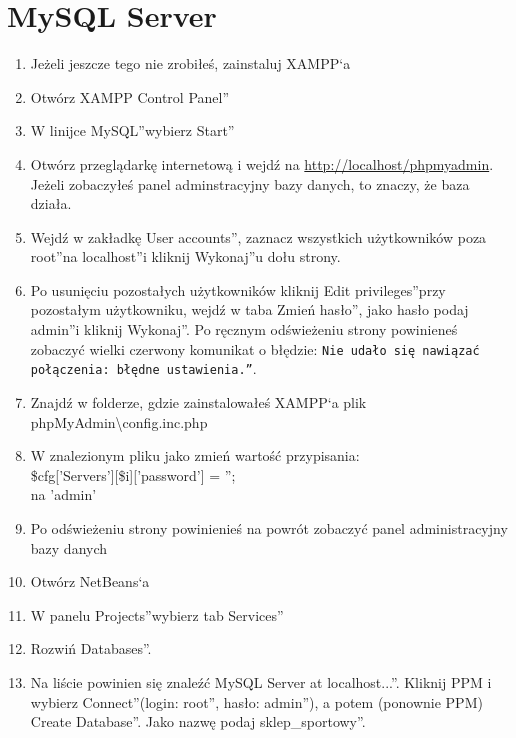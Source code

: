 \documentclass[a4paper, 11pt]{article}
\begin{document}
	\section{MySQL Server}
	\begin{enumerate}
		\item Jeżeli jeszcze tego nie zrobiłeś, zainstaluj XAMPP`a
		\item Otwórz \quotedblbase XAMPP Control Panel\textquotedblright
		\item W linijce \quotedblbase MySQL\textquotedblright wybierz \quotedblbase Start\textquotedblright
		\item Otwórz przeglądarkę internetową i wejdź na \url{http://localhost/phpmyadmin}. Jeżeli zobaczyłeś panel adminstracyjny bazy danych, to znaczy, że baza działa.
		\item Wejdź w zakładkę \quotedblbase User accounts\textquotedblright, zaznacz wszystkich użytkowników poza \quotedblbase root\textquotedblright na \quotedblbase localhost\textquotedblright i kliknij \quotedblbase Wykonaj\textquotedblright u dołu strony.
		\item Po usunięciu pozostałych użytkowników kliknij \quotedblbase Edit privileges\textquotedblright przy pozostałym użytkowniku, wejdź w taba \quotedblbase Zmień hasło\textquotedblright, jako hasło podaj \quotedblbase admin\textquotedblright i kliknij \quotedblbase Wykonaj\textquotedblright. Po ręcznym odświeżeniu strony powinieneś zobaczyć wielki czerwony komunikat o błędzie: \texttt{\quotedblbase Nie udało się nawiązać połączenia: błędne ustawienia.\textquotedblright}.
		\item Znajdź w folderze, gdzie zainstalowałeś XAMPP`a plik phpMyAdmin\textbackslash config.inc.php
		\item W znalezionym pliku jako zmień wartość przypisania:\\
			\$cfg['Servers'][\$i]['password'] = '';\\
			na 'admin'
		\item Po odświeżeniu strony powinienieś na powrót zobaczyć panel administracyjny bazy danych
		\item Otwórz NetBeans`a
		\item W panelu \quotedblbase Projects\textquotedblright wybierz tab \quotedblbase Services\textquotedblright
		\item Rozwiń \quotedblbase Databases\textquotedblright.
		\item Na liście powinien się znaleźć \quotedblbase MySQL Server at localhost...\textquotedblright. Kliknij PPM i wybierz \quotedblbase Connect\textquotedblright (login: \quotedblbase root\textquotedblright, hasło: \quotedblbase admin\textquotedblright), a potem (ponownie PPM) \quotedblbase Create Database\textquotedblright. Jako nazwę podaj \quotedblbase sklep{\_}sportowy\textquotedblright. 

\end{enumerate}
\end{document}
